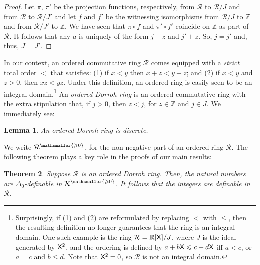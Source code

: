 \documentclass{amsart}
\renewcommand{\leq}{\leqslant}
\renewcommand{\geq}{\geqslant}
\newtheorem{theorem}{Theorem}[section]
\newtheorem{lem}[theorem]{Lemma}
\newcommand{\mc}[1]{\mathcal #1}
\newcommand{\X}{{\sf X}}
\begin{document}
\begin{proof}
    Let $\pi$, $\pi'$ be the projection functions, respectively, from $\mc R$ to $\mc R/J$ and
    from $\mc R$ to $\mc R/J'$ and let $f$ and $f'$ be the witnessing isomorphisms
    from $\mc R/J$ to $\mathbb Z$ and from $\mc R/J'$ to $\mathbb Z$.
    We have seen that $\pi\circ f$ and $\pi'\circ f'$ coincide on $\mathbb Z$
    as part of $\mc R$. It follows that any $a$ is uniquely of the form
    $j+z$ and $j'+z$. So, $j=j'$ and, thus, $J=J'$.
\end{proof}
In our context, an ordered commutative ring $\mathcal{R}$ comes equipped with a \emph{strict} total order $<$ that satisfies: %
(1) if $x<y$ then $x+z<y+z$; and (2) if $x<y$ and $z>0$, then $xz<yz$. Under this definition, an ordered ring is easily seen to be an integral domain.\footnote{Surprisingly, if (1) and (2) are reformulated by replacing $<$ with $\leq$, then the resulting definition no longer guarantees that the ring is an integral domain. One such example is the ring $\mathcal{R}=\mathbb{R}[\X]/J$, where $J$ is the ideal generated by $\X^{2}$, and the ordering is defined by $a+b\X  \leq c+d\X$ iff $a<c$, or $a=c$ and $b\leq d$. Note that $\X^2=0$, so $\mathcal{R}$ is not an integral domain.}
An \emph{ordered Dorroh ring} is an ordered commutative ring with the extra stipulation that, if $j>0$, then  $z<j$, for 
$z\in \mathbb Z$ and $j\in J$. We immediately see:

\begin{lem}
    An ordered Dorroh ring is discrete.
\end{lem}

We write $\mc R^{\mathsmaller{\geq 0}}$, for the non-negative part of an ordered ring $\mc R$.
The following theorem plays a key role in the proofs of our main results:
\begin{theorem}\label{Dorroh_fourquares}
Suppose $\mc R$ is an ordered Dorroh ring. Then,
    the natural numbers are $\Delta_0$-definable in $\mc R^{\mathsmaller{\geq 0}}$.
    It follows that the integers are definable in $\mc R$.
\end{theorem}
\end{document}
